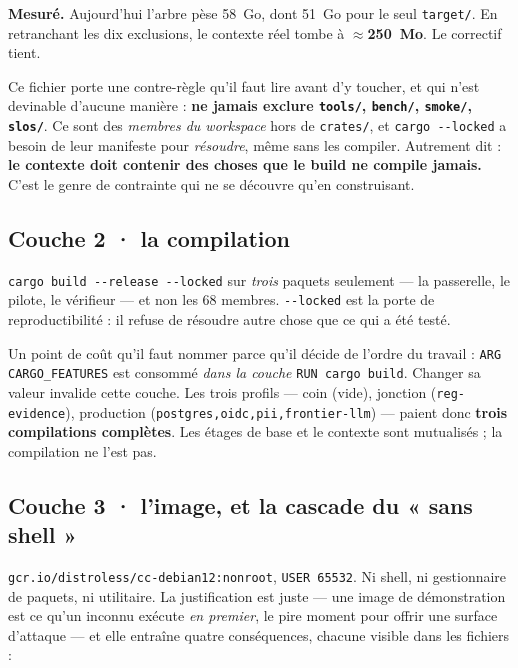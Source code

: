 \documentclass[11pt]{article}
\newcommand{\code}[1]{\texttt{\small #1}}
\newcommand{\best}[1]{{\color{efesolve}\textbf{#1}}}
\newcommand{\mesure}[1]{{\color{efeteal}\textbf{Mesuré.} }#1\par}
\begin{document}
\mesure{Aujourd'hui l'arbre pèse 58~Go, dont 51~Go pour le seul \code{target/}. En retranchant les
dix exclusions, le contexte réel tombe à \best{$\approx$250~Mo}. Le correctif tient.}

Ce fichier porte une contre-règle qu'il faut lire avant d'y toucher, et qui n'est devinable
d'aucune manière : \textbf{ne jamais exclure \code{tools/}, \code{bench/}, \code{smoke/},
\code{slos/}}. Ce sont des \emph{membres du workspace} hors de \code{crates/}, et \code{cargo
-{}-locked} a besoin de leur manifeste pour \emph{résoudre}, même sans les compiler. Autrement dit :
\textbf{le contexte doit contenir des choses que le build ne compile jamais.} C'est le genre de
contrainte qui ne se découvre qu'en construisant.

\subsection{Couche 2 · la compilation}
\code{cargo build -{}-release -{}-locked} sur \emph{trois} paquets seulement --- la passerelle, le
pilote, le vérifieur --- et non les 68 membres. \code{-{}-locked} est la porte de reproductibilité :
il refuse de résoudre autre chose que ce qui a été testé.

Un point de coût qu'il faut nommer parce qu'il décide de l'ordre du travail : \code{ARG
CARGO\_FEATURES} est consommé \emph{dans la couche} \code{RUN cargo build}. Changer sa valeur
invalide cette couche. Les trois profils --- coin (vide), jonction (\code{reg-evidence}), production
(\code{postgres,oidc,pii,frontier-llm}) --- paient donc \textbf{trois compilations complètes}. Les
étages de base et le contexte sont mutualisés ; la compilation ne l'est pas.

\subsection{Couche 3 · l'image, et la cascade du « sans shell »}
\code{gcr.io/distroless/cc-debian12:nonroot}, \code{USER 65532}. Ni shell, ni gestionnaire de
paquets, ni utilitaire. La justification est juste --- une image de démonstration est ce qu'un
inconnu exécute \emph{en premier}, le pire moment pour offrir une surface d'attaque --- et elle
entraîne quatre conséquences, chacune visible dans les fichiers :
\end{document}
